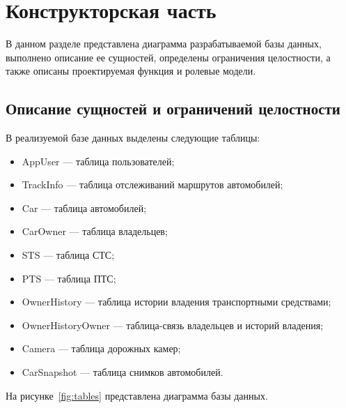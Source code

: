 \chapter{Конструкторская часть}

В данном разделе представлена диаграмма разрабатываемой базы данных, выполнено описание ее сущностей, определены ограничения целостности, а также описаны проектируемая функция и ролевые модели.

\section{Описание сущностей и ограничений целостности}

В реализуемой базе данных выделены следующие таблицы:

\begin{itemize}[label=---]
    \item AppUser --- таблица пользователей;
    \item TrackInfo --- таблица отслеживаний маршрутов автомобилей;
    \item Car --- таблица автомобилей;
    \item CarOwner --- таблица владельцев;
    \item STS --- таблица СТС;
    \item PTS --- таблица ПТС;
    \item OwnerHistory --- таблица истории владения транспортными средствами;
    \item OwnerHistoryOwner --- таблица-связь владельцев и историй владения;
    \item Camera --- таблица дорожных камер;
    \item CarSnapshot --- таблица снимков автомобилей.
\end{itemize}

На рисунке~\ref{fig:tables} представлена диаграмма базы данных.

